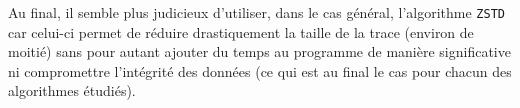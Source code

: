 Au final, il semble plus judicieux d'utiliser, dans le cas général, l'algorithme \verb!ZSTD! car celui-ci permet de réduire drastiquement la taille de la trace (environ de moitié)
sans pour autant ajouter du temps au programme de manière significative ni compromettre l'intégrité des données (ce qui est au final le cas pour chacun des algorithmes étudiés).